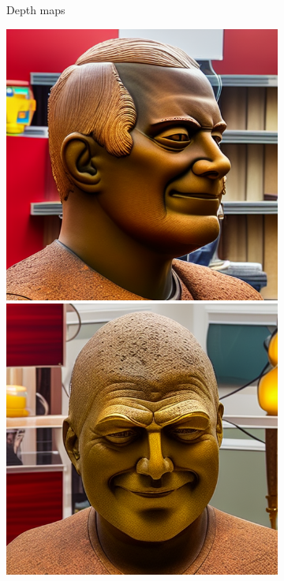 \begin{figure}[ht]
\begin{subfigure}{0.18\linewidth}
        \caption{Depth maps}
	\end{subfigure}
    \begin{subfigure}{0.18\linewidth}
        \includegraphics[width=\textwidth]{Figures/failed/controlnet/0-4-5-1-5648_230239_266.png}
        \includegraphics[width=\textwidth]{Figures/failed/controlnet/0-2-4-2-293_210300_829.png}

\end{subfigure}
\end{figure}
